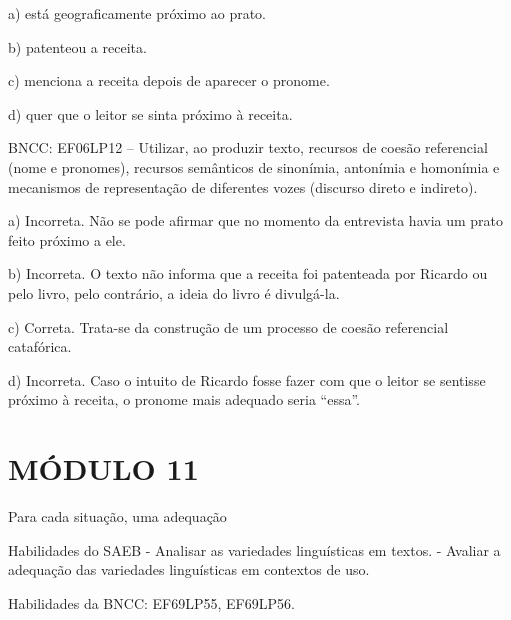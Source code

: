 a) está geograficamente próximo ao prato.

b) patenteou a receita.

c) menciona a receita depois de aparecer o pronome.

d) quer que o leitor se sinta próximo à receita.

BNCC: EF06LP12 -- Utilizar, ao produzir texto, recursos de coesão
referencial (nome e pronomes), recursos semânticos de sinonímia,
antonímia e homonímia e mecanismos de representação de diferentes vozes
(discurso direto e indireto).

a) Incorreta. Não se pode afirmar que no momento da entrevista havia um
prato feito próximo a ele.

b) Incorreta. O texto não informa que a receita foi patenteada por
Ricardo ou pelo livro, pelo contrário, a ideia do livro é divulgá-la.

c) Correta. Trata-se da construção de um processo de coesão referencial
catafórica.

d) Incorreta. Caso o intuito de Ricardo fosse fazer com que o leitor se
sentisse próximo à receita, o pronome mais adequado seria ``essa''.

\hypertarget{muxf3dulo-11}{%
\section{MÓDULO 11}\label{muxf3dulo-11}}

Para cada situação, uma adequação

Habilidades do SAEB - Analisar as variedades linguísticas em textos. -
Avaliar a adequação das variedades linguísticas em contextos de uso.

Habilidades da BNCC: EF69LP55, EF69LP56.

